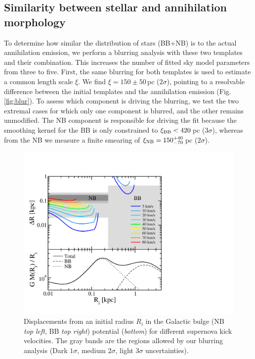 \documentclass[doublespace,draft,nopageskip]{VTthesis} %
\begin{document}
	
	
	\subsection{Similarity between stellar and annihilation morphology}\label{sec:blurring_analysis}
	To determine how similar the distribution of stars (BB+NB) is to the actual annihilation emission, we perform a blurring analysis with these two templates and their combination.
	This increases the number of fitted sky model parameters from three to five.
	First, the same blurring for both templates is used to estimate a common length scale $\xi$.
	We find $\xi = 150 \pm 50$\,pc ($2\sigma$), pointing to a resolvable difference between the initial templates and the annihilation emission (Fig. \,\ref{fig:blur}).
	To assess which component is driving the blurring, we test the two extremal cases for which only one component is blurred, and the other remains unmodified.
	The NB component is responsible for driving the fit because the smoothing kernel for the BB is only constrained to $\xi_{\rm BB} < 420$\,pc ($3\sigma$), whereas from the NB we measure a finite smearing of $\xi_{\rm NB} = 150^{+40}_{-70}$\,pc ($2\sigma$).
	
	

	\begin{figure}
		\centering
		\includegraphics[width=0.75\columnwidth,trim=0.20in 0.55in 3.7in 1.2in,clip=true]{Figures/511keV/Fig_bulgeblur_total_2.pdf}%
		\caption{Displacements from an initial radius $R_i$ in the Galactic bulge (NB \textit{top left}, BB \textit{top right}) potential (\textit{bottom}) for different supernova kick velocities. The gray bands are the regions allowed by our blurring analysis (Dark $1\sigma$, medium $2\sigma$, light $3\sigma$ uncertainties).}%
		\label{fig:kicks}%
	\end{figure}
	
\end{document}
